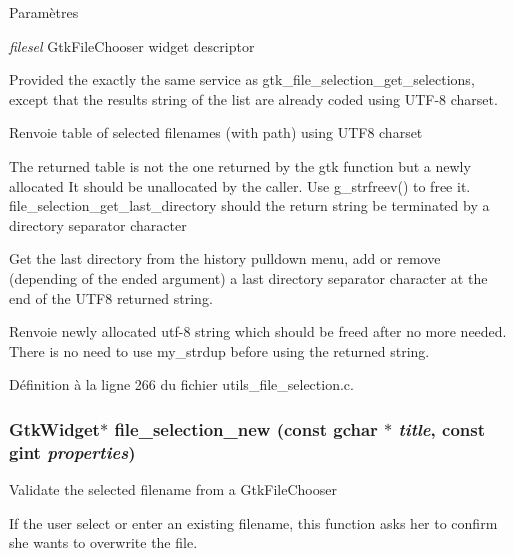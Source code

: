 \begin{DoxyParams}{Paramètres}
\item[{\em filesel}]GtkFileChooser widget descriptor\end{DoxyParams}
Provided the exactly the same service as gtk\_\-file\_\-selection\_\-get\_\-selections, except that the results string of the list are already coded using UTF-\/8 charset.

\begin{DoxyReturn}{Renvoie}
table of selected filenames (with path) using UTF8 charset
\end{DoxyReturn}
The returned table is not the one returned by the gtk function but a newly allocated It should be unallocated by the caller. Use g\_\-strfreev() to free it. file\_\-selection\_\-get\_\-last\_\-directory   should the return string be terminated by a directory separator character

Get the last directory from the history pulldown menu, add or remove (depending of the ended argument) a last directory separator character at the end of the UTF8 returned string.

\begin{DoxyReturn}{Renvoie}
newly allocated utf-\/8 string which should be freed after no more needed. There is no need to use my\_\-strdup before using the returned string. 
\end{DoxyReturn}


Définition à la ligne 266 du fichier utils\_\-file\_\-selection.c.

\subsubsection[{file\_\-selection\_\-new}]{\setlength{\rightskip}{0pt plus 5cm}GtkWidget$\ast$ file\_\-selection\_\-new (const gchar $\ast$ {\em title}, \/  const gint {\em properties})}\label{utils__file__selection_8h_a28d01f93cf3b5c0f02cb506b15338c29}
Validate the selected filename from a GtkFileChooser

If the user select or enter an existing filename, this function asks her to confirm she wants to overwrite the file.


